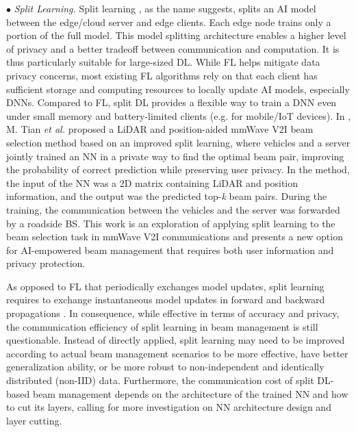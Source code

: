 \documentclass[journal,comsoc]{IEEEtran}
\begin{document}
$\bullet$ \emph{Split Learning.} Split learning \cite{AI-in-6G-2022}, as the name suggests, splits an AI model between the edge/cloud server and edge clients. Each edge node trains only a portion of the full model. This model splitting architecture enables a higher level of privacy and a better tradeoff between communication and computation. It is thus particularly suitable for large-sized DL. While FL helps mitigate data privacy concerns, most existing FL algorithms rely on that each client has sufficient storage and computing resources to locally update AI models, especially DNNs. Compared to FL, split DL provides a flexible way to train a DNN even under small memory and battery-limited clients (e.g. for mobile/IoT devices). In \cite{A-Privacy-Preserved-Split-Learning-2022}, M. Tian \emph{et al.} proposed a LiDAR and position-aided mmWave V2I beam selection method based on an improved split learning, where vehicles and a server jointly trained an NN in a private way to find the optimal beam pair, improving the probability of correct prediction while preserving user privacy. In the method, the input of the NN was a 2D matrix containing LiDAR and position information, and the output was the predicted top-\emph{k} beam pairs. During the training, the communication between the vehicles and the server was forwarded by a roadside BS. This work is an exploration of applying split learning to the beam selection task in mmWave V2I communications and presents a new option for AI-empowered beam management that requires both user information and privacy protection.

As opposed to FL that periodically exchanges model updates, split learning requires to exchange instantaneous model updates in forward and backward propagations \cite{Communication-Efficient-Distributed-Learning-2021}. In consequence, while effective in terms of accuracy and privacy, the communication efficiency of split learning in beam management is still questionable. Instead of directly applied, split learning may need to be improved according to actual beam management scenarios to be more effective, have better generalization ability, or be more robust to non-independent and identically distributed (non-IID) data. Furthermore, the communication cost of split DL-based beam management depends on the architecture of the trained NN and how to cut its layers, calling for more investigation on NN architecture design and layer cutting.
\end{document}
